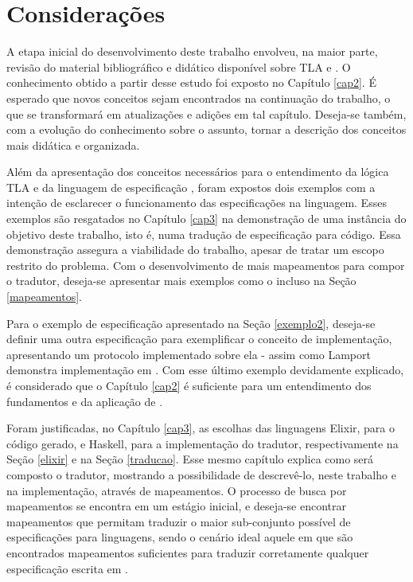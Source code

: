 \chapter{Considerações}

A etapa inicial do desenvolvimento deste trabalho envolveu, na maior parte, revisão do material bibliográfico e didático disponível sobre TLA e \TLAA. O conhecimento obtido a partir desse estudo foi exposto no Capítulo \ref{cap2}. É esperado que novos conceitos sejam encontrados na continuação do trabalho, o que se transformará em atualizações e adições em tal capítulo. Deseja-se também, com a evolução do conhecimento sobre o assunto, tornar a descrição dos conceitos mais didática e organizada.

Além da apresentação dos conceitos necessários para o entendimento da lógica TLA e da linguagem de especificação \TLAA, foram expostos dois exemplos com a intenção de esclarecer o funcionamento das especificações na linguagem. Esses exemplos são resgatados no Capítulo \ref{cap3} na demonstração de uma instância do objetivo deste trabalho, isto é, numa tradução de especificação para código. Essa demonstração assegura a viabilidade do trabalho, apesar de tratar um escopo restrito do problema. Com o desenvolvimento de mais mapeamentos para compor o tradutor, deseja-se apresentar mais exemplos como o incluso na Seção \ref{mapeamentos}.

Para o exemplo de especificação apresentado na Seção \ref{exemplo2}, deseja-se definir uma outra especificação para exemplificar o conceito de implementação, apresentando um protocolo implementado sobre ela - assim como Lamport demonstra implementação em \cite{video-protocol}. Com esse último exemplo devidamente explicado, é considerado que o Capítulo \ref{cap2} é suficiente para um entendimento dos fundamentos e da aplicação de \TLAA.

Foram justificadas, no Capítulo \ref{cap3}, as escolhas das linguagens Elixir, para o código gerado, e Haskell, para a implementação do tradutor, respectivamente na Seção \ref{elixir} e na Seção \ref{traducao}. Esse mesmo capítulo explica como será composto o tradutor, mostrando a possibilidade de descrevê-lo, neste trabalho e na implementação, através de mapeamentos. O processo de busca por mapeamentos se encontra em um estágio inicial, e deseja-se encontrar mapeamentos que permitam traduzir o maior sub-conjunto possível de especificações para linguagens, sendo o cenário ideal aquele em que são encontrados mapeamentos suficientes para traduzir corretamente qualquer especificação escrita em \TLAA.

